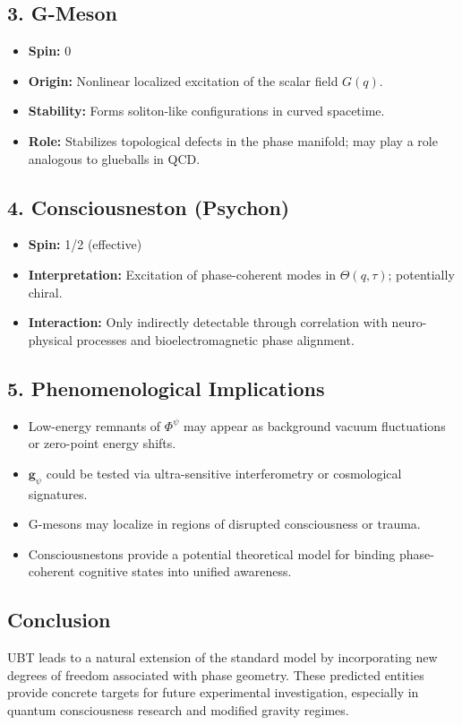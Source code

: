 \subsection*{3. G-Meson}

\begin{itemize}
  \item \textbf{Spin:} 0
  \item \textbf{Origin:} Nonlinear localized excitation of the scalar field \(G(q)\).
  \item \textbf{Stability:} Forms soliton-like configurations in curved spacetime.
  \item \textbf{Role:} Stabilizes topological defects in the phase manifold; may play a role analogous to glueballs in QCD.
\end{itemize}

\subsection*{4. Consciousneston (Psychon)}

\begin{itemize}
  \item \textbf{Spin:} 1/2 (effective)
  \item \textbf{Interpretation:} Excitation of phase-coherent modes in \(\Theta(q,\tau)\); potentially chiral.
  \item \textbf{Interaction:} Only indirectly detectable through correlation with neuro-physical processes and bioelectromagnetic phase alignment.
\end{itemize}

\subsection*{5. Phenomenological Implications}

\begin{itemize}
  \item Low-energy remnants of \(\Phi^\psi\) may appear as background vacuum fluctuations or zero-point energy shifts.
  \item \(\mathbf{g}_\psi\) could be tested via ultra-sensitive interferometry or cosmological signatures.
  \item G-mesons may localize in regions of disrupted consciousness or trauma.
  \item Consciousnestons provide a potential theoretical model for binding phase-coherent cognitive states into unified awareness.
\end{itemize}

\subsection*{Conclusion}

UBT leads to a natural extension of the standard model by incorporating new degrees of freedom associated with phase geometry. These predicted entities provide concrete targets for future experimental investigation, especially in quantum consciousness research and modified gravity regimes.
